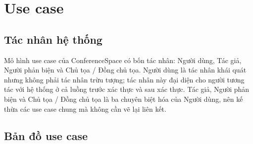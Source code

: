 \section{Use case}
\label{sec:ch3-demo-usecases}

\subsection{Tác nhân hệ thống}

Mô hình use case của ConferenceSpace có bốn tác nhân: Người dùng, Tác giả, Người phản biện và Chủ tọa / Đồng chủ tọa. Người dùng là tác nhân khái quát nhưng không phải tác nhân trừu tượng; tác nhân này đại diện cho người tương tác với hệ thống ở cả luồng trước xác thực và sau xác thực. Tác giả, Người phản biện và Chủ tọa / Đồng chủ tọa là ba chuyên biệt hóa của Người dùng, nên kế thừa các use case chung mà không cần vẽ lại liên kết.

\subsection{Bản đồ use case}

